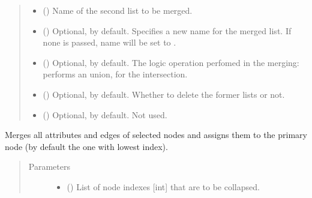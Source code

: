 \documentclass[letterpaper,10pt,english]{sphinxmanual}
\begin{document}
\begin{fulllineitems}
\begin{fulllineitems}
\begin{quote}
\begin{description}
\begin{itemize}
\item {} 
 () \textendash{} Name of the second list to be merged.

\item {} 
 () \textendash{} Optional,  by default. Specifies a new name for the
merged list. If none is passed, name will be set to
.

\item {} 
 () \textendash{} Optional,  by default. The logic operation perfomed
in the merging:  performs an union,  for
the intersection.

\item {} 
 () \textendash{} Optional,  by default. Whether to delete the
former lists or not.

\item {} 
 () \textendash{} Optional,  by default. Not used.

\end{itemize}

\end{description}\end{quote}

\end{fulllineitems}


\begin{fulllineitems}
\label{\detokenize{reference:pypath.main.PyPath.merge_nodes}}
Merges all attributes and edges of selected nodes and assigns
them to the primary node (by default the one with lowest index).
\begin{quote}\begin{description}
\item[{Parameters}] \leavevmode\begin{itemize}
\item {} 
 () \textendash{} List of node indexes {[}int{]} that are to be collapsed.


\end{itemize}
\end{description}
\end{quote}
\end{fulllineitems}
\end{fulllineitems}
\end{document}
